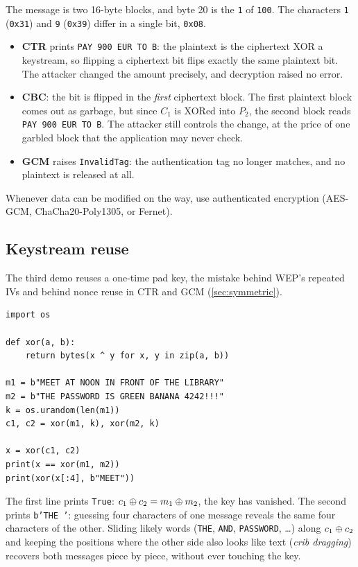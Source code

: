 The message is two 16-byte blocks, and byte 20 is the \texttt{1} of \texttt{100}. The characters \texttt{1} (\texttt{0x31}) and \texttt{9} (\texttt{0x39}) differ in a single bit, \texttt{0x08}.
\begin{itemize}
    \item \textbf{CTR} prints \texttt{PAY 900 EUR TO B}: the plaintext is the ciphertext XOR a keystream, so flipping a ciphertext bit flips exactly the same plaintext bit. The attacker changed the amount precisely, and decryption raised no error.
    \item \textbf{CBC}: the bit is flipped in the \emph{first} ciphertext block. The first plaintext block comes out as garbage, but since $C_1$ is XORed into $P_2$, the second block reads \texttt{PAY 900 EUR TO B}. The attacker still controls the change, at the price of one garbled block that the application may never check.
    \item \textbf{GCM} raises \texttt{InvalidTag}: the authentication tag no longer matches, and no plaintext is released at all.
\end{itemize}
Whenever data can be modified on the way, use authenticated encryption (AES-GCM, ChaCha20-Poly1305, or Fernet).

\subsection{Keystream reuse}

The third demo reuses a one-time pad key, the mistake behind WEP's repeated IVs and behind nonce reuse in CTR and GCM (\cref{sec:symmetric}).

\begin{verbatim}
import os

def xor(a, b):
    return bytes(x ^ y for x, y in zip(a, b))

m1 = b"MEET AT NOON IN FRONT OF THE LIBRARY"
m2 = b"THE PASSWORD IS GREEN BANANA 4242!!!"
k = os.urandom(len(m1))
c1, c2 = xor(m1, k), xor(m2, k)

x = xor(c1, c2)
print(x == xor(m1, m2))
print(xor(x[:4], b"MEET"))
\end{verbatim}

The first line prints \texttt{True}: $c_1 \oplus c_2 = m_1 \oplus m_2$, the key has vanished. The second prints \texttt{b'THE '}: guessing four characters of one message reveals the same four characters of the other. Sliding likely words (\texttt{THE}, \texttt{AND}, \texttt{PASSWORD}, \dots) along $c_1 \oplus c_2$ and keeping the positions where the other side also looks like text (\emph{crib dragging}) recovers both messages piece by piece, without ever touching the key.

